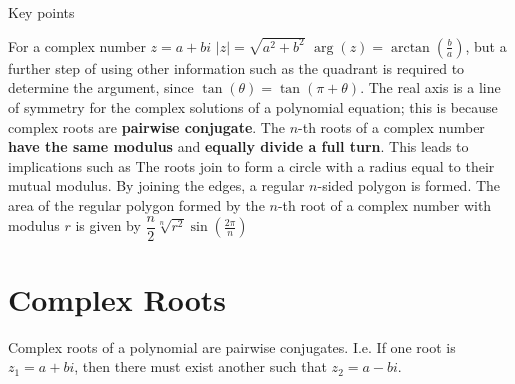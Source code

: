 \documentclass[11pt]{article}
\begin{document}
\noindent Key points
\begin{outline}[enumerate]
  \1 For a complex number $z = a + bi$
  \2 $|z| = \sqrt{a^2 + b^2}$
  \2 $\arg(z) = \arctan(\frac{b}{a})$, but a further step of using other information such as the quadrant is required to determine the argument, since $\tan(\theta) = \tan(\pi + \theta)$.
  \1 The real axis is a line of symmetry for the complex solutions of a polynomial equation; this is because complex roots are \textbf{pairwise conjugate}.
  \1 The $n$-th roots of a complex number \textbf{have the same modulus} and \textbf{equally divide a full turn}. This leads to implications such as
  \2 The roots join to form a circle with a radius equal to their mutual modulus.
  \2 By joining the edges, a regular $n$-sided polygon is formed.
  \2 The area of the regular polygon formed by the $n$-th root of a complex number with modulus $r$ is given by $\dfrac{n}{2}\sqrt[n]{r^2}\sin(\frac{2\pi}{n})$
\end{outline}

\pagebreak

\section{Complex Roots}

Complex roots of a polynomial are pairwise conjugates. I.e. If one root is $z_1 = a + bi$, then there must exist another such that $z_2 = a - bi$.
\end{document}
